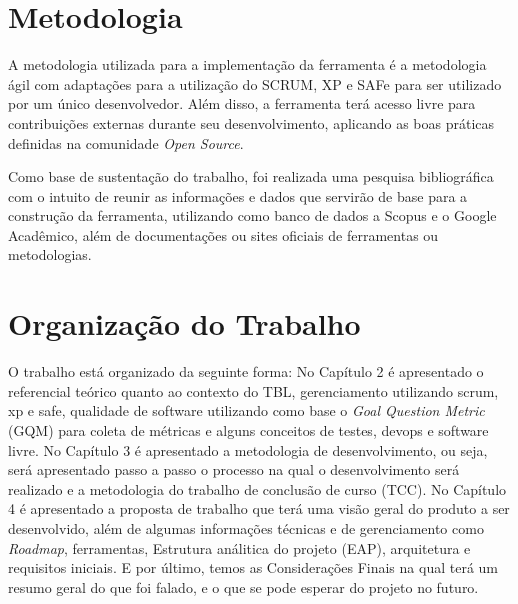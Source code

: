 \section{Metodologia}

A metodologia utilizada para a implementação da ferramenta é a metodologia ágil com adaptações para a utilização do SCRUM, XP e SAFe para ser utilizado por um único desenvolvedor. Além disso, a ferramenta terá acesso livre para contribuições externas durante seu desenvolvimento, aplicando as boas práticas definidas na comunidade \textit{Open Source}.

Como base de sustentação do trabalho, foi realizada uma pesquisa bibliográfica com o intuito de reunir as informações e dados que servirão de base para a construção da ferramenta, utilizando como banco de dados a Scopus e o Google Acadêmico, além de documentações ou sites oficiais de ferramentas ou metodologias.

\section{Organização do Trabalho}

O trabalho está organizado da seguinte forma: No Capítulo 2 é apresentado o referencial teórico quanto ao contexto do TBL, gerenciamento utilizando scrum, xp e safe, qualidade de software utilizando como base o \textit{Goal Question Metric} (GQM) para coleta de métricas e alguns conceitos de testes, devops e software livre. No Capítulo 3 é apresentado a metodologia de desenvolvimento, ou seja, será apresentado passo a passo o processo na qual o desenvolvimento será realizado e a metodologia do trabalho de conclusão de curso (TCC). No Capítulo 4 é apresentado a proposta de trabalho que terá uma visão geral do produto a ser desenvolvido, além de algumas informações técnicas e de gerenciamento como \textit{Roadmap}, ferramentas, Estrutura análitica do projeto (EAP), arquitetura e requisitos iniciais. E por último, temos as Considerações Finais na qual terá um resumo geral do que foi falado, e o que se pode esperar do projeto no futuro.
